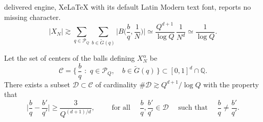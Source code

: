 \documentclass[10pt,a4paper]{amsart}
\begin{document}
delivered engine, XeLaTeX with its default Latin Modern text font, reports no missing character.
\begin{equation}\label{eq:Size_X_N}
    |X_N| \gtrsim \sum_{q \in \mathcal P_Q} \sum_{b \in \widetilde{G}(q)} \Big| B\Big( \frac{b}{q}, \frac{1}{N} \Big) \Big| 
    \simeq \frac{Q^{d+1}}{\log Q} \, \frac{1}{N^d}
    \simeq \frac{1}{\log Q}. 
\end{equation}

\begin{lem}\label{thm:Disjointness}
    Let the set of centers of the balls defining $X_N^\alpha$ be 
    \begin{equation}
        \mathcal C = \Big\{ \, \frac{b}{q} \, \, : \, \,  q \in \mathcal P_Q, \quad b \in \widetilde{G}(q)    \,   \Big\}
        \subset [0,1]^d \cap \mathbb Q.
    \end{equation}
    There exists a subset $\mathcal D \subset \mathcal C$
    of cardinality $\#\mathcal D \gtrsim  Q^{d+1}/\log Q$ with the property that 
    \begin{equation}
        \Big| \frac{b}{q} - \frac{b'}{q'}  \Big| \geq \frac{3}{Q^{(d+1)/d}}, 
        \qquad \text{ for all } \quad \frac{b}{q},  \frac{b'}{q'} \in \mathcal D \quad \text{ such that } \quad \frac{b}{q} \neq  \frac{b'}{q'} . 
    \end{equation}
\end{lem}
\end{document}
